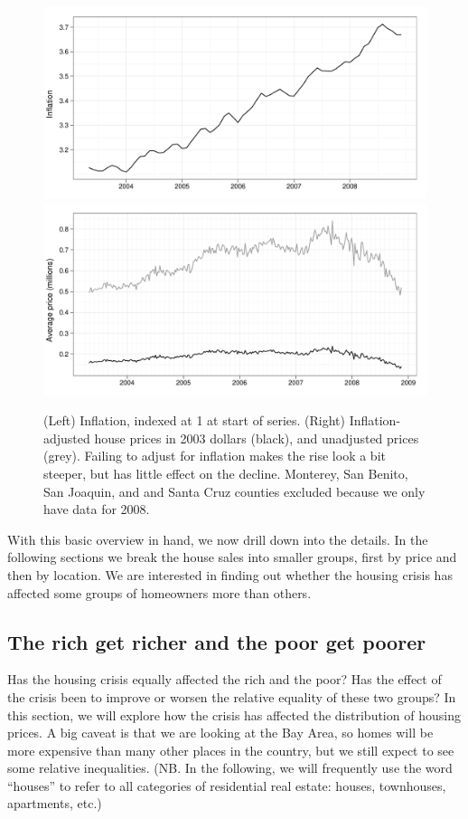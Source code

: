 \documentclass[oneside]{article}
\begin{document}
\begin{figure}[htbp]
  \centering
    \includegraphics[width=0.5 \linewidth]{daily-cpi}%
    \includegraphics[width=0.5 \linewidth]{daily-price-adj}
  \caption{(Left) Inflation, indexed at 1 at start of series.  (Right) Inflation-adjusted house prices in 2003 dollars (black), and unadjusted prices (grey).  Failing to adjust for inflation makes the rise look a bit steeper, but has little effect on the decline. Monterey, San Benito, San Joaquin, and
and Santa Cruz counties excluded because we only have data for 2008.}
  \label{fig:inflation}
\end{figure}

With this basic overview in hand, we now drill down into the details. In the following sections we break the house sales into smaller groups, first by price and then by location.  We are interested in finding out whether the housing crisis has affected some groups of homeowners more than others.

\subsection{The rich get richer and the poor get poorer}

Has the housing crisis equally affected the rich and the poor?  Has the effect of the crisis been to improve or worsen the relative equality of these two groups?  In this section, we will explore how the crisis has affected the distribution of housing prices.  A big caveat is that we are looking at the Bay Area, so homes will be more expensive than many other places in the country, but we still expect to see some relative inequalities.  (NB.  In the following, we will frequently use the word ``houses'' to refer to all categories of residential real estate: houses, townhouses, apartments, etc.)
\end{document}
